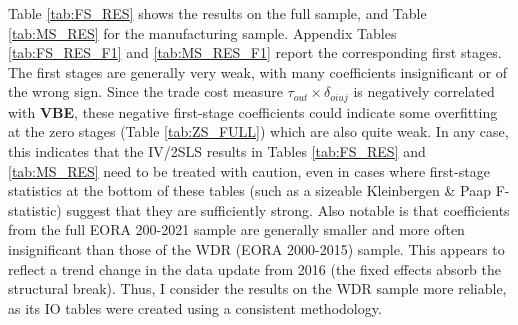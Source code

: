 \documentclass[a4paper]{article}
\begin{document}
Table \ref{tab:FS_RES} shows the results on the full sample, and Table \ref{tab:MS_RES} for the manufacturing sample. Appendix Tables \ref{tab:FS_RES_F1} and \ref{tab:MS_RES_F1} report the corresponding first stages. The first stages are generally very weak, with many coefficients insignificant or of the wrong sign. Since the trade cost measure $\tau_{out}\times \delta_{oiuj}$ is negatively correlated with \textbf{VBE}, these negative first-stage coefficients could indicate some overfitting at the zero stages (Table \ref{tab:ZS_FULL}) which are also quite weak. In any case, this indicates that the IV/2SLS results in Tables \ref{tab:FS_RES} and \ref{tab:MS_RES} need to be treated with caution, even in cases where first-stage statistics at the bottom of these tables (such as a sizeable Kleinbergen \& Paap F-statistic) suggest that they are sufficiently strong. Also notable is that coefficients from the full EORA 200-2021 sample are generally smaller and more often insignificant than those of the WDR (EORA 2000-2015) sample. This appears to reflect a trend change in the data update from 2016 (the fixed effects absorb the structural break). Thus, I consider the results on the WDR sample more reliable, as its IO tables were created using a consistent methodology. 
\end{document}
